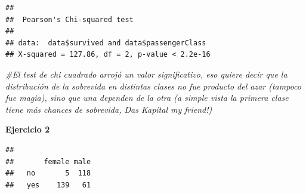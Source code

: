 \documentclass[
]{book}
\newenvironment{Shaded}{\begin{snugshade}}{\end{snugshade}}
\newcommand{\CommentTok}[1]{\textcolor[rgb]{0.56,0.35,0.01}{\textit{#1}}}
\newcommand{\FunctionTok}[1]{\textcolor[rgb]{0.00,0.00,0.00}{#1}}
\newcommand{\NormalTok}[1]{#1}
\newcommand{\OtherTok}[1]{\textcolor[rgb]{0.56,0.35,0.01}{#1}}
\newcommand{\SpecialCharTok}[1]{\textcolor[rgb]{0.00,0.00,0.00}{#1}}
\newcommand{\StringTok}[1]{\textcolor[rgb]{0.31,0.60,0.02}{#1}}
\begin{document}
\begin{verbatim}
## 
##  Pearson's Chi-squared test
## 
## data:  data$survived and data$passengerClass
## X-squared = 127.86, df = 2, p-value < 2.2e-16
\end{verbatim}

\begin{Shaded}
\begin{Highlighting}[]
\CommentTok{\#El test de chi cuadrado arrojó un valor significativo, eso quiere decir que la distribución de la sobrevida en distintas clases no fue producto del azar (tampoco fue magia), sino que una dependen de la otra (a simple vista la primera clase tiene más chances de sobrevida, Das Kapital my friend!)}
\end{Highlighting}
\end{Shaded}

\textbf{Ejercicio 2}

\begin{Shaded}
\end{Shaded}

\begin{verbatim}
##      
##       female male
##   no       5  118
##   yes    139   61
\end{verbatim}

\begin{Shaded}
\end{Shaded}
\end{document}
